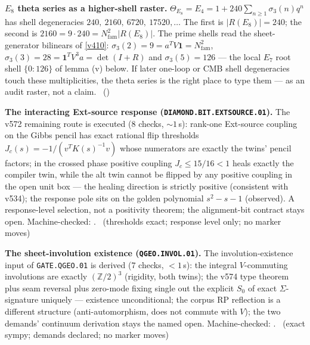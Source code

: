 \documentclass[11pt,a4paper]{article}
\newcommand{\Nfam}{N_{\mathrm{fam}}}
\theoremstyle{definition}
\begin{document}
\par\smallskip\noindent\textbf{$E_8$ theta series as a higher-shell raster.}
$\Theta_{E_8}=E_4=1+240\sum_{n\ge1}\sigma_3(n)q^n$ has shell degeneracies
$240,\ 2160,\ 6720,\ 17520,\dots$ The first is $|R(E_8)|=240$; the second is
$2160=9\cdot240=\Nfam^2|R(E_8)|$. The prime shells read the sheet-generator bilinears of \vref{v410}:
$\sigma_3(2)=9=a^TV\mathbf 1=\Nfam^2$, $\sigma_3(3)=28=\mathbf 1^TV^3a=\det(I{+}R)$ and
$\sigma_3(5)=126$ --- the local $E_7$ root shell $\{0{:}126\}$ of lemma (v) below. If later one-loop or CMB
shell degeneracies touch these multiplicities, the theta series is the right place to type them --- as an
audit raster, not a claim. \mO\ ()

\par\smallskip\noindent\textbf{The interacting Ext-source response
(\texttt{DIAMOND.BIT.EXTSOURCE.01}).}
The v572 remaining route is executed ($8$ checks, ${\sim}1$\,s):
rank-one Ext-source coupling on the Gibbs pencil has exact rational
flip thresholds $J_c(s)=-1/(v^{T}K(s)^{-1}v)$ whose numerators are
exactly the twins' pencil factors; in the crossed phase positive
coupling $J_c\le15/16<1$ heals exactly the compiler twin, while the
alt twin cannot be flipped by any positive coupling in the open unit
box --- the healing direction is strictly positive (consistent with
v534); the response pole sits on the golden polynomial $s^2-s-1$
(observed).  A response-level selection, not a positivity theorem; the
alignment-bit contract stays open. Machine-checked:
.
\mE\ (thresholds exact; response level only; no marker moves)
\par\smallskip

\par\smallskip\noindent\textbf{The sheet-involution existence
(\texttt{QGEO.INVOL.01}).}
The involution-existence input of \texttt{GATE.QGEO.01} is derived
($7$ checks, $<1$\,s): the integral $V$-commuting involutions are
exactly $(\mathbb{Z}/2)^3$ (rigidity, both twins); the v574 type
theorem plus seam reversal plus zero-mode fixing single out the
explicit $S_0$ of exact $\Sigma$-signature uniquely --- existence
unconditional; the corpus RP reflection is a different structure
(anti-automorphism, does not commute with $V$); the two demands'
continuum derivation stays the named open. Machine-checked:
.
\mE\ (exact sympy; demands declared; no marker moves)
\par\smallskip
\end{document}
